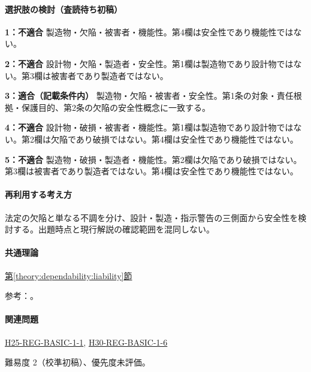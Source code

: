 \paragraph{選択肢の検討（査読待ち初稿）}\mbox{}\par

\noindent\textbf{1：不適合} 製造物・欠陥・被害者・機能性。第4欄は安全性であり機能性ではない。\par

\noindent\textbf{2：不適合} 設計物・欠陥・製造者・安全性。第1欄は製造物であり設計物ではない。第3欄は被害者であり製造者ではない。\par

\noindent\textbf{3：適合（記載条件内）} 製造物・欠陥・被害者・安全性。第1条の対象・責任根拠・保護目的、第2条の欠陥の安全性概念に一致する。\par

\noindent\textbf{4：不適合} 設計物・破損・被害者・機能性。第1欄は製造物であり設計物ではない。第2欄は欠陥であり破損ではない。第4欄は安全性であり機能性ではない。\par

\noindent\textbf{5：不適合} 製造物・破損・製造者・機能性。第2欄は欠陥であり破損ではない。第3欄は被害者であり製造者ではない。第4欄は安全性であり機能性ではない。\par

\paragraph{再利用する考え方} 法定の欠陥と単なる不調を分け、設計・製造・指示警告の三側面から安全性を検討する。出題時点と現行解説の確認範囲を混同しない。

\paragraph{共通理論} \hyperref[theory:dependability:liability]{第\ref*{theory:dependability:liability}節}

\par 参考：\cite{design_caa_pl1,design_caa_pl2}。

\paragraph{関連問題} \hyperref[q:h25-reg-basic-1-1]{H25-REG-BASIC-1-1}, \hyperref[q:h30-reg-basic-1-6]{H30-REG-BASIC-1-6}

\par 難易度 2（校準初稿）、優先度未評価。

